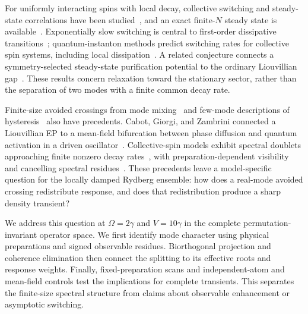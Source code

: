 \documentclass[aps,pra,twocolumn,superscriptaddress,amsmath,amssymb,reprint,floatfix]{revtex4-2}
\begin{document}
For uniformly interacting spins with local decay, collective switching and steady-state correlations have been studied~\cite{Lee2012,LeeChan2013}, and an exact finite-$N$ steady state is available~\cite{RobertsClerk2023}. Exponentially slow switching is central to first-order dissipative transitions~\cite{Casteels2017}; quantum-instanton methods predict switching rates for collective spin systems, including local dissipation~\cite{PCE2026,CEP2026}. A related conjecture connects a symmetry-selected steady-state purification potential to the ordinary Liouvillian gap~\cite{NoachtarClerk2026}. These results concern relaxation toward the stationary sector, rather than the separation of two modes with a finite common decay rate.

Finite-size avoided crossings from mode mixing~\cite{Kessler2012} and few-mode descriptions of hysteresis~\cite{Krimer2019} also have precedents. Cabot, Giorgi, and Zambrini connected a Liouvillian EP to a mean-field bifurcation between phase diffusion and quantum activation in a driven oscillator~\cite{Cabot2024}. Collective-spin models exhibit spectral doublets approaching finite nonzero decay rates~\cite{RubioGarcia2022}, with preparation-dependent visibility and cancelling spectral residues~\cite{Molina2026}. These precedents leave a model-specific question for the locally damped Rydberg ensemble: how does a real-mode avoided crossing redistribute response, and does that redistribution produce a sharp density transient?

We address this question at $\Omega=2\gamma$ and $V=10\gamma$ in the complete permutation-invariant operator space. We first identify mode character using physical preparations and signed observable residues. Biorthogonal projection and coherence elimination then connect the splitting to its effective roots and response weights. Finally, fixed-preparation scans and independent-atom and mean-field controls test the implications for complete transients. This separates the finite-size spectral structure from claims about observable enhancement or asymptotic switching.
\end{document}
